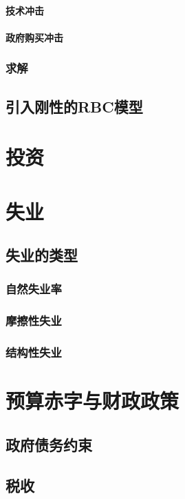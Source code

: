 \paragraph*{技术冲击}

\paragraph*{政府购买冲击}

\subsubsection{求解}

\subsection{引入刚性的RBC模型}


\section{投资}

\section{失业}
\subsection{失业的类型}
\subsubsection{自然失业率}

\subsubsection{摩擦性失业}

\subsubsection{结构性失业}


\section{预算赤字与财政政策}
\subsection{政府债务约束}

\subsection{税收}

